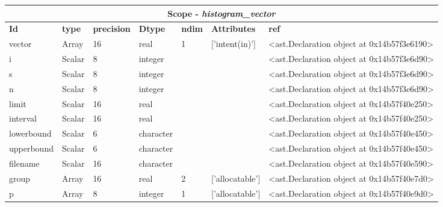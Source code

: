 \documentclass{report}
\begin{document}
\begin{center}
\begin{longtable}{|p{3.5cm}|p{1.5cm}|p{1.5cm}|p{1.5cm}|p{1cm}|p{2cm}|p{4cm}| }
\hline
\multicolumn{7}{|c|}{\textbf{Scope} -  \textbf{\textit{histogram\_vector}}} \\ 
\hline
\textbf{Id} & \textbf{type} & \textbf{precision} & \textbf{Dtype} & \textbf{ndim} & \textbf{Attributes} & \textbf{ref} \\\hline

vector & Array & 16 & real & 1 & ['intent(in)'] & <ast.Declaration object at 0x14b57f3e6190> \\\hline

i & Scalar & 8 & integer &  &  & <ast.Declaration object at 0x14b57f3e6d90> \\\hline

s & Scalar & 8 & integer &  &  & <ast.Declaration object at 0x14b57f3e6d90> \\\hline

n & Scalar & 8 & integer &  &  & <ast.Declaration object at 0x14b57f3e6d90> \\\hline

limit & Scalar & 16 & real &  &  & <ast.Declaration object at 0x14b57f40e250> \\\hline

interval & Scalar & 16 & real &  &  & <ast.Declaration object at 0x14b57f40e250> \\\hline

lowerbound & Scalar & 6 & character &  &  & <ast.Declaration object at 0x14b57f40e450> \\\hline

upperbound & Scalar & 6 & character &  &  & <ast.Declaration object at 0x14b57f40e450> \\\hline

filename & Scalar & 16 & character &  &  & <ast.Declaration object at 0x14b57f40e590> \\\hline

group & Array & 16 & real & 2 & ['allocatable'] & <ast.Declaration object at 0x14b57f40e7d0> \\\hline

p & Array & 8 & integer & 1 & ['allocatable'] & <ast.Declaration object at 0x14b57f40e9d0> \\\hline

\end{longtable}
\end{center}

 \vspace{1cm}
\end{document}
